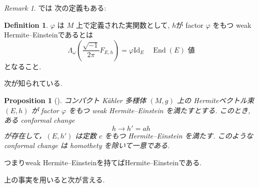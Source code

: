 \documentclass[dvipdfmx,a4paper,11pt]{article} %
\newtheorem{prop}[thm]{Proposition}
\theoremstyle{definition}
\newtheorem{defn}[thm]{Definition}
\theoremstyle{remark}
\newtheorem{rem}[thm]{Remark}
\numberwithin{equation}{section}
\newcommand{\End}[0]{\operatorname{End}}
\begin{document}
\begin{rem}
\cite{Kob14}では
次の定義もある:
\begin{defn}
$\varphi$ は $M$ 上で定義された実関数として, $h$が
factor $\varphi$ をもつ weak Hermite--Einsteinであるとは 
$$
\Lambda_{\omega}(\frac{\sqrt{-1}}{2\pi}F_{E,h})=
\varphi \mathrm{Id}_E
\quad \text{\(\End(E)\) 値}
$$
となること.
\end{defn}
次が知られている. 
\begin{prop}[{\cite[Prop 4.2.4]{Kob14}}]
コンパクト Kähler 多様体 $(M,g)$ 上の Hermiteベクトル束 $(E,h)$ が factor $\varphi$ をもつ  weak Hermite--Einstein を満たすとする. このとき, ある conformal change
\[
h\longrightarrow h'=ah
\]
が存在して，$(E,h')$ は定数 $c$ をもつ Hermite--Einstein を満たす. このような conformal change は homothety を除いて一意である.
\end{prop}
つまりweak Hermite--Einsteinを持てばHermite--Einsteinである. 
\end{rem}
上の事実を用いると次が言える. 
\end{document}
